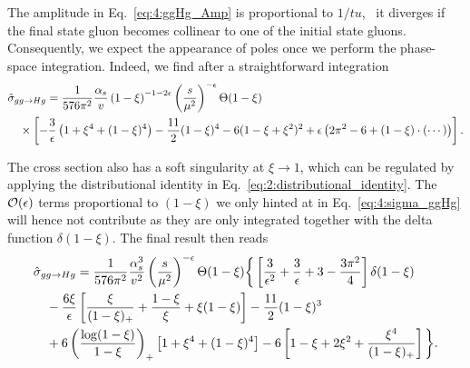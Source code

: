 The amplitude in Eq.~\eqref{eq:4:ggHg_Amp} is proportional to $1/tu$, \ie\ it diverges if the final state gluon becomes collinear to one of the initial state gluons. Consequently, we expect the appearance of poles once we perform the phase-space integration. Indeed, we find after a straightforward integration
\begin{equation}
\begin{split}
& \hat{\sigma}_{gg \rightarrow H g} = \frac{1}{576 \pi^2} \frac{\alpha_s}{v} \left(1 - \xi \right)^{-1 - 2 \epsilon} \left( \frac{s}{\mu^2} \right)^{-\epsilon} \Theta (1 - \xi) \\
& \quad \times \left[ - \frac{3}{\epsilon} \left(1 + \xi^4 + (1 - \xi)^4 \right) - \frac{11}{2} (1 - \xi)^4 - 6 (1 - \xi + \xi^2)^2 + \epsilon \left( 2 \pi^2 - 6 + (1 - \xi)\cdot \left(\cdots \right) \right) \right].
\label{eq:4:sigma_ggHg}
\end{split}
\end{equation}

The cross section also has a soft singularity at $\xi \rightarrow 1$, which can be regulated by applying the distributional identity in Eq.~\eqref{eq:2:distributional_identity}. The $\mathcal{O}\!\left(\epsilon\right)$ terms proportional to $(1 - \xi)$ we only hinted at in Eq.~\eqref{eq:4:sigma_ggHg} will hence not contribute as they are only integrated together with the delta function $\delta (1 - \xi)$. The final result then reads
\begin{equation}
\begin{split}
& \hat{\sigma}_{gg \rightarrow H g} = \frac{1}{576 \pi^2} \frac{\alpha_s^3}{v^2} \left(\frac{s}{\mu^2} \right)^{-\epsilon} \Theta (1 - \xi) \bigg \lbrace \left[ \frac{3}{\epsilon^2} + \frac{3}{\epsilon} + 3 - \frac{3 \pi^2}{4} \right] \delta(1 - \xi) \\
&\quad - \frac{6 \xi}{\epsilon} \left[ \frac{\xi}{(1 - \xi)_+} + \frac{1 - \xi}{\xi} + \xi (1 - \xi) \right] - \frac{11}{2} (1 - \xi)^3 \\
& \quad + 6 \left(\frac{\log (1 - \xi)}{1 - \xi} \right)_+ \left[1 + \xi^4 + (1 - \xi)^4 \right] - 6 \left[1 - \xi + 2 \xi^2 + \frac{\xi^4}{(1 - \xi)_+} \right] \bigg \rbrace.
\end{split}
\label{eq:4:sigma_ggHg_full}
\end{equation}


